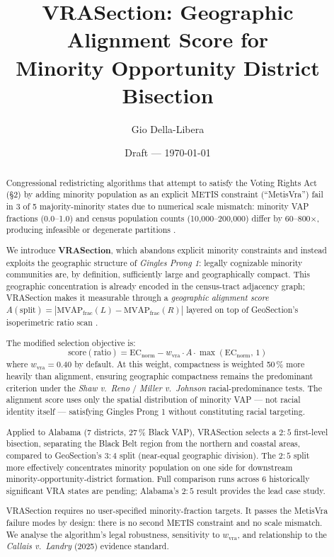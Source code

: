 \documentclass[12pt]{article}
\title{VRASection: Geographic Alignment Score for\\
       Minority Opportunity District Bisection}
\author{Gio Della-Libera}
\date{Draft --- \today}
\begin{document}
\maketitle

\begin{abstract}
Congressional redistricting algorithms that attempt to satisfy the Voting
Rights Act (\S 2) by adding minority population as an explicit METIS
constraint (``MetisVra'') fail in 3 of 5 majority-minority states due to
numerical scale mismatch: minority VAP fractions (0.0--1.0) and census
population counts (10,000--200,000) differ by 60--800$\times$, producing
infeasible or degenerate partitions \citep{b3paper}.

We introduce \textbf{VRASection}, which abandons explicit minority constraints
and instead exploits the geographic structure of \emph{Gingles Prong 1}:
legally cognizable minority communities are, by definition, sufficiently
large and geographically compact.
This geographic concentration is already encoded in the census-tract adjacency
graph; VRASection makes it measurable through a \emph{geographic alignment score}
$A(\text{split}) = |\text{MVAP}_\text{frac}(L) - \text{MVAP}_\text{frac}(R)|$
layered on top of GeoSection's isoperimetric ratio scan \citep{b8paper}.

The modified selection objective is:
\[
  \text{score}(\text{ratio}) = \mathrm{EC}_{\text{norm}} - w_\text{vra}
  \cdot A \cdot \max(\mathrm{EC}_{\text{norm}},\, 1)
\]
where $w_\text{vra} = 0.40$ by default.
At this weight, compactness is weighted 50\,\% more heavily than alignment,
ensuring geographic compactness remains the predominant criterion
under the \emph{Shaw v.\ Reno} / \emph{Miller v.\ Johnson} racial-predominance tests.
The alignment score uses only the spatial distribution of minority VAP ---
not racial identity itself --- satisfying Gingles Prong 1 without constituting
racial targeting.

Applied to Alabama (7 districts, 27\,\% Black VAP), VRASection selects
a $2:5$ first-level bisection, separating the Black Belt region from the
northern and coastal areas, compared to GeoSection's $3:4$ split
(near-equal geographic division).
The $2:5$ split more effectively concentrates minority population on one
side for downstream minority-opportunity-district formation.
Full comparison runs across 6 historically significant VRA states are
pending; Alabama's $2:5$ result provides the lead case study.

VRASection requires no user-specified minority-fraction targets.
It passes the MetisVra failure modes by design: there is no second METIS
constraint and no scale mismatch.
We analyse the algorithm's legal robustness, sensitivity to $w_\text{vra}$,
and relationship to the \emph{Callais v.\ Landry} (2025) evidence standard.
\end{abstract}










\end{document}
